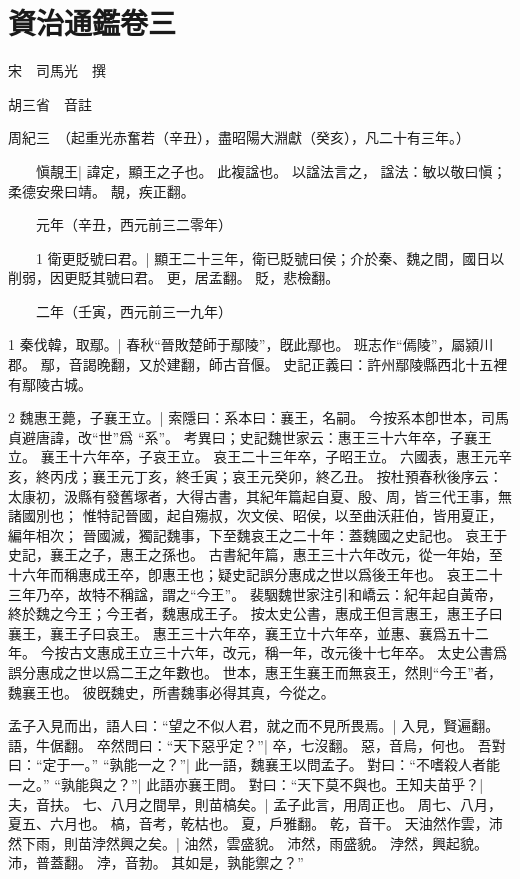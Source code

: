 \chapter{資治通鑑卷三}

宋　司馬光　撰

胡三省　音註

周紀三　（起重光赤奮若（辛丑），盡昭陽大淵獻（癸亥），凡二十有三年。）

　　愼靚王|{
	諱定，顯王之子也。
	此複諡也。
	以諡法言之，
	諡法：敏以敬曰愼；柔德安衆曰靖。
	靚，疾正翻。
}


　　元年（辛丑，西元前三二零年）

　　1 衛更貶號曰君。|{
	顯王二十三年，衛已貶號曰侯；介於秦、魏之間，國日以削弱，因更貶其號曰君。
	更，居孟翻。
	貶，悲檢翻。
}

　　二年（壬寅，西元前三一九年）

1 秦伐韓，取鄢。|{
	春秋“晉敗楚師于鄢陵”，旣此鄢也。
	班志作“傿陵”，屬潁川郡。
	鄢，音謁晚翻，又於建翻，師古音偃。
	史記正義曰：許州鄢陵縣西北十五裡有鄢陵古城。
}

2 魏惠王薨，子襄王立。|{
	索隱曰：系本曰：襄王，名嗣。
	今按系本卽世本，司馬貞避唐諱，改“世”爲 “系”。
	考異曰；史記魏世家云：惠王三十六年卒，子襄王立。
	襄王十六年卒，子哀王立。
	哀王二十三年卒，子昭王立。
	六國表，惠王元辛亥，終丙戌；襄王元丁亥，終壬寅；哀王元癸卯，終乙丑。
	按杜預春秋後序云：太康初，汲縣有發舊塚者，大得古書，其紀年篇起自夏、殷、周，皆三代王事，無諸國別也；
	惟特記晉國，起自殤叔，次文侯、昭侯，以至曲沃莊伯，皆用夏正，編年相次；
	晉國滅，獨記魏事，下至魏哀王之二十年：蓋魏國之史記也。
	哀王于史記，襄王之子，惠王之孫也。
	古書紀年篇，惠王三十六年改元，從一年始，至十六年而稱惠成王卒，卽惠王也；疑史記誤分惠成之世以爲後王年也。
	哀王二十三年乃卒，故特不稱諡，謂之“今王”。
	裴駰魏世家注引和嶠云：紀年起自黃帝，終於魏之今王；今王者，魏惠成王子。
	按太史公書，惠成王但言惠王，惠王子曰襄王，襄王子曰哀王。
	惠王三十六年卒，襄王立十六年卒，並惠、襄爲五十二年。
	今按古文惠成王立三十六年，改元，稱一年，改元後十七年卒。
	太史公書爲誤分惠成之世以爲二王之年數也。
	世本，惠王生襄王而無哀王，然則“今王”者，魏襄王也。
	彼旣魏史，所書魏事必得其真，今從之。
}

	孟子入見而出，語人曰：“望之不似人君，就之而不見所畏焉。|{
	入見，賢遍翻。
	語，牛倨翻。
}
卒然問曰：“天下惡乎定？”|{
	卒，七沒翻。
	惡，音烏，何也。
}
吾對曰：“定于一。”
“孰能一之？”|{
	此一語，魏襄王以問孟子。
}
對曰：“不嗜殺人者能一之。”
“孰能與之？”|{
	此語亦襄王問。
}
對曰：“天下莫不與也。王知夫苗乎？|{
	夫，音扶。
}
七、八月之間旱，則苗槁矣。|{
	孟子此言，用周正也。
	周七、八月，夏五、六月也。
	槁，音考，乾枯也。
	夏，戶雅翻。
	乾，音干。
}
天油然作雲，沛然下雨，則苗浡然興之矣。|{
	油然，雲盛貌。
	沛然，雨盛貌。
	浡然，興起貌。
	沛，普蓋翻。
	浡，音勃。
}
其如是，孰能禦之？”

